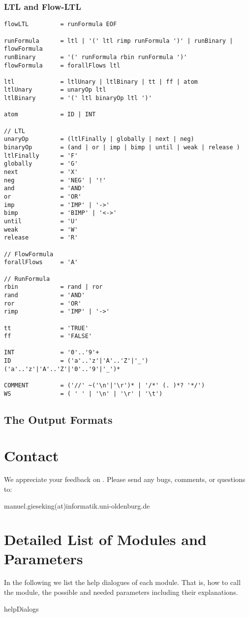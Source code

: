 \documentclass[12pt,twoside,a4paper,openright]{memoir}
\begin{document}
\subsection{LTL and Flow-LTL}
\begin{lstlisting}[captionpos=b, caption=Grammar of Flow-LTL, label = lst:grammar,language=ebnf]
flowLTL 		= runFormula EOF

runFormula 		= ltl | '(' ltl rimp runFormula ')' | runBinary | flowFormula
runBinary 		= '(' runFormula rbin runFormula ')'
flowFormula 	= forallFlows ltl

ltl 			= ltlUnary | ltlBinary | tt | ff | atom
ltlUnary 		= unaryOp ltl
ltlBinary 		= '(' ltl binaryOp ltl ')'

atom 			= ID | INT

// LTL
unaryOp 		= (ltlFinally | globally | next | neg)
binaryOp 		= (and | or | imp | bimp | until | weak | release )
ltlFinally 		= 'F'
globally 		= 'G'
next 			= 'X'
neg 			= 'NEG' | '!'
and 			= 'AND'
or 				= 'OR' 
imp				= 'IMP' | '->'
bimp			= 'BIMP' | '<->'
until 			= 'U'
weak 			= 'W'
release 		= 'R'

// FlowFormula
forallFlows 	= 'A'

// RunFormula
rbin 			= rand | ror
rand 			= 'AND'
ror				= 'OR'
rimp 			= 'IMP' | '->'

tt 				= 'TRUE'
ff 				= 'FALSE'

INT 			= '0'..'9'+
ID  			= ('a'..'z'|'A'..'Z'|'_') ('a'..'z'|'A'..'Z'|'0'..'9'|'_')*

COMMENT			= ('//' ~('\n'|'\r')* | '/*' (. )*? '*/')
WS				= ( ' ' | '\n' | '\r' | '\t')
\end{lstlisting}
\section{The Output Formats}


\chapter{Contact}
We appreciate your feedback on \tool{}. Please send any bugs, comments, or
questions to:
\begin{center}
 manuel.gieseking(at)informatik.uni-oldenburg.de
\end{center}

\appendix
\chapter{Detailed List of Modules and Parameters}
\label{app:detailedModules}
In the following we list the help dialogues of each module.
That is, how to call the module, the possible 
and needed parameters including their explanations.
\begin{subappendices}
{helpDialogs}
\end{subappendices}
\end{document}

